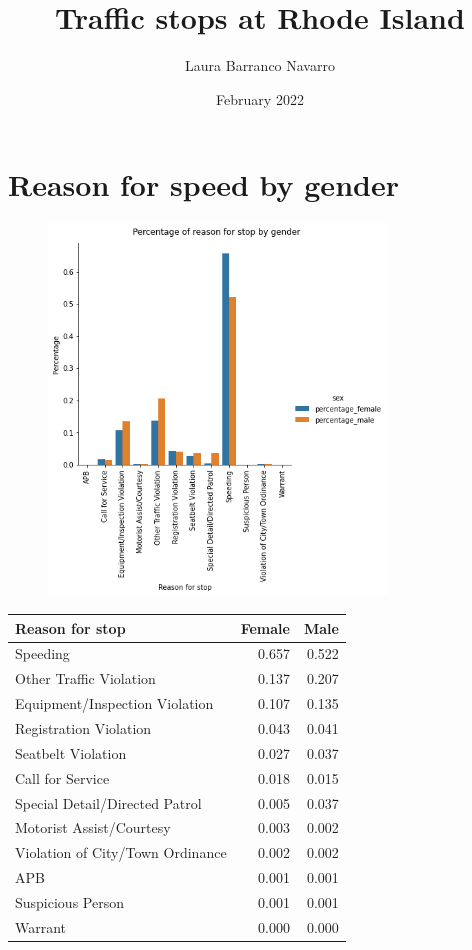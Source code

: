 \documentclass{article}
\title{Traffic stops at Rhode Island}
\author{Laura Barranco Navarro }
\date{February 2022}
\begin{document}
\maketitle
\newpage
\tableofcontents
\newpage
\section{Reason for speed by gender}

 \begin{figure}
\includegraphics[width=0.8\textwidth]{../figures/reason_gender.png}
\end{figure}   



\begin{tabular}{lrr}
\toprule
                  Reason for stop & Female & Male \\
\midrule
                        Speeding &  0.657 & 0.522 \\
         Other Traffic Violation &  0.137 & 0.207 \\
  Equipment/Inspection Violation &  0.107 & 0.135 \\
          Registration Violation &  0.043 & 0.041 \\
              Seatbelt Violation &  0.027 & 0.037 \\
                Call for Service &  0.018 & 0.015 \\
  Special Detail/Directed Patrol &  0.005 & 0.037 \\
        Motorist Assist/Courtesy &  0.003 & 0.002 \\
Violation of City/Town Ordinance &  0.002 & 0.002 \\
                             APB &  0.001 & 0.001 \\
               Suspicious Person &  0.001 & 0.001 \\
                         Warrant &  0.000 & 0.000 \\
\bottomrule
\end{tabular}
\FloatBarrier
\end{document}
